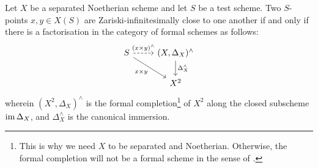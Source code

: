         \begin{proposition} \label{prop: infinitesimality_and_the_diagonal}
            Let $X$ be a separated Noetherian scheme and let $S$ be a test scheme. Two $S$-points $x, y \in X(S)$ are Zariski-infinitesimally close to one another if and only if there is a factorisation in the category of formal schemes as follows:
                $$
                    \begin{tikzcd}
                    S & {(X, \Delta_X)^{\wedge}} \\
                    & {X^2}
                    \arrow["(x \x y)^{\wedge}", dashed, from=1-1, to=1-2]
                    \arrow["{x \x y}"', from=1-1, to=2-2]
                    \arrow["{\Delta_X^{\wedge}}", from=1-2, to=2-2]
                    \end{tikzcd}
                $$
            wherein $(X^2, \Delta_X)^{\wedge}$ is the formal completion\footnote{This is why we need $X$ to be separated and Noetherian. Otherwise, the formal completion will not be a formal scheme in the sense of \cite{hartshorne}.} of $X^2$ along the closed subscheme $\operatorname{im} \Delta_X$, and $\Delta_X^{\wedge}$ is the canonical immersion. 
        \end{proposition}
